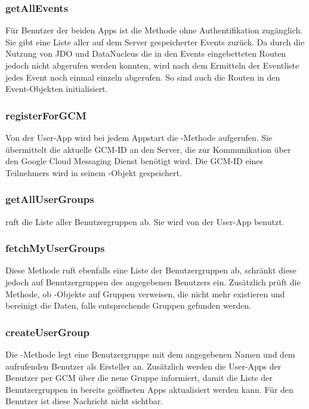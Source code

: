 \subsubsection*{getAllEvents}
Für Benutzer der beiden Apps ist die Methode  ohne Authentifikation zugänglich. Sie gibt eine Liste aller auf dem Server gespeicherter Events zurück. Da durch die Nutzung von JDO und DataNucleus die in den Events eingebetteten Routen jedoch nicht abgerufen werden konnten, wird nach dem Ermitteln der Eventliste jedes Event noch einmal einzeln abgerufen. So sind auch die Routen in den Event-Objekten initialisiert.

\subsubsection*{registerForGCM}
Von der User-App wird bei jedem Appstart die -Methode aufgerufen. Sie übermittelt die aktuelle GCM-ID an den Server, die zur Kommunikation über den Google Cloud Messaging Dienst benötigt wird. Die GCM-ID eines Teilnehmers wird in seinem -Objekt gespeichert.

\subsubsection*{getAllUserGroups}
 ruft die Liste aller Benutzergruppen ab. Sie wird von der User-App benutzt.

\subsubsection*{fetchMyUserGroups}
Diese Methode ruft ebenfalls eine Liste der Benutzergruppen ab, schränkt diese jedoch auf Benutzergruppen des angegebenen Benutzers ein. Zusätzlich prüft die Methode, ob -Objekte auf Gruppen verweisen, die nicht mehr existieren und bereinigt die Daten, falls entsprechende Gruppen gefunden werden.

\subsubsection*{createUserGroup}
Die -Methode legt eine Benutzergruppe mit dem angegebenen Namen und dem aufrufenden Benutzer als Ersteller an. Zusätzlich werden die User-Apps der Benutzer per GCM über die neue Gruppe informiert, damit die Liste der Benutzergruppen in bereits geöffneten Apps aktualisiert werden kann. Für den Benutzer ist diese Nachricht nicht sichtbar.

